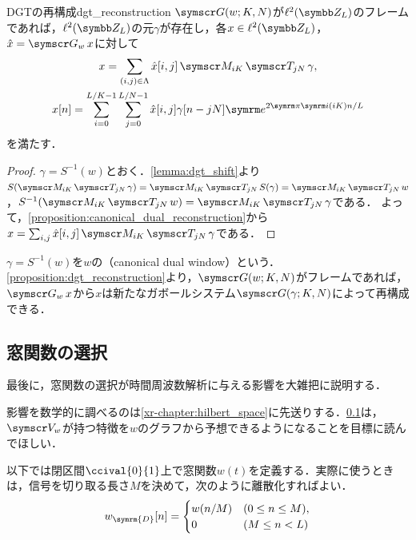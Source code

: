 \documentclass[../../main]{subfiles}
\begin{document}
\begin{proposition}{DGTの再構成}{dgt_reconstruction}
  \(\gaborsys{w}{K}{N}\)が\(\cycles{L}\)のフレームであれば，\(\cycles{L}\)の元\(\gamma\)が存在し，各\(x\in\cycles{L}\)，\(\hat{x}=\dgt{w}x\)に対して
  \begin{gather*}
    x = \sum_{(i,j)\in\Lambda}\hat{x}[i,j]\modulate{iK}\translate{jN}\gamma, \\
    x[n] = \sum_{i=0}^{L/K-1}\sum_{j=0}^{L/N-1}\hat{x}[i,j]\gamma[n-jN]\napr^{2\krez\iuni(iK)n/L}
  \end{gather*}
  を満たす．
\end{proposition}

\begin{proof}
  \(\gamma=S^{-1}(w)\)とおく．\cref{lemma:dgt_shift}より\(S(\modulate{iK}\translate{jN}\gamma)=\modulate{iK}\translate{jN}S(\gamma)=\modulate{iK}\translate{jN}w\)，\(S^{-1}(\modulate{iK}\translate{jN}w)=\modulate{iK}\translate{jN}\gamma\)である．
  よって，\cref{proposition:canonical_dual_reconstruction}から\(x=\sum_{i,j}\hat{x}[i,j]\modulate{iK}\translate{jN}\gamma\)である．
\end{proof}

\(\gamma=S^{-1}(w)\)を\(w\)の（canonical dual window）という．
\cref{proposition:dgt_reconstruction}より，\(\gaborsys{w}{K}{N}\)がフレームであれば，\(\dgt{w}x\)から\(x\)は新たなガボールシステム\(\gaborsys{\gamma}{K}{N}\)によって再構成できる．

\subsection{窓関数の選択}
\label{subsection:choice_of_window}

最後に，窓関数の選択が時間周波数解析に与える影響を大雑把に説明する．

\begin{note}
  影響を数学的に調べるのは\cref{xr-chapter:hilbert_space}に先送りする．\cref{subsection:choice_of_window}は，\(\stft{w}\)が持つ特徴を\(w\)のグラフから予想できるようになることを目標に読んでほしい．
\end{note}

以下では閉区間\(\ccival{0}{1}\)上で窓関数\(w(t)\)を定義する．実際に使うときは，信号を切り取る長さ\(M\)を決めて，次のように離散化すればよい．
\[
  w_{\symrm{D}}[n] = \begin{cases}w(n/M) & (0\leq n\leq M), \\ 0 & (M\leq n<L)\end{cases}
\]
\end{document}
